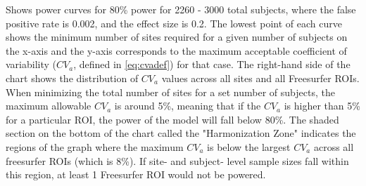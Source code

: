 \label{fig:cv_j} Shows power curves for 80\% power for 2260 - 3000 total subjects, where the false positive rate is 0.002, and the effect size is 0.2. The lowest point of each curve shows the minimum number of sites required for a given number of subjects on the x-axis and the y-axis corresponds to the maximum acceptable coefficient of variability ($CV_{a}$, defined in \ref{eq:cvadef}) for that case. The right-hand side of the chart shows the distribution of $CV_{a}$ values across all sites and all Freesurfer ROIs. When minimizing the total number of sites for a set number of subjects, the maximum allowable $CV_{a}$ is around 5\%, meaning that if the $CV_{a}$ is higher than 5\% for a particular ROI, the power of the model will fall below 80\%. The shaded section on the bottom of the chart called the "Harmonization Zone" indicates the regions of the graph where the maximum $CV_{a}$ is below the largest $CV_{a}$ across all freesurfer ROIs (which is 8\%). If site- and subject- level sample sizes fall within this region, at least 1 Freesurfer ROI would not be powered.